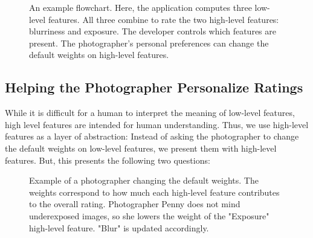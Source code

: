 \documentclass[11pt,letter]{article}
\begin{document}
\begin{figure*}[b!]
  \centering
  \caption{An example flowchart. Here, the application computes three low-level features. All three combine to rate the two high-level features: blurriness and exposure. The developer controls which features are present. The photographer's personal preferences can change the default weights on high-level features.}
  \label{fig:flowchart}
\end{figure*}

\subsection{Helping the Photographer Personalize Ratings}
\label{abstraction}
While it is difficult for a human to interpret the meaning of low-level features, high level features are intended for human understanding. Thus, we use high-level features as a layer of abstraction: Instead of asking the photographer to change the default weights on low-level features, we present them with high-level features. But, this presents the following two questions:


\begin{figure}
\centering
{}
\caption{Example of a photographer changing the default weights. The weights correspond to how much each high-level feature contributes to the overall rating. Photographer Penny does not mind underexposed images, so she lowers the weight of the "Exposure" high-level feature. "Blur" is updated accordingly.}
\label{fig:weighttable}
\end{figure}
\end{document}
